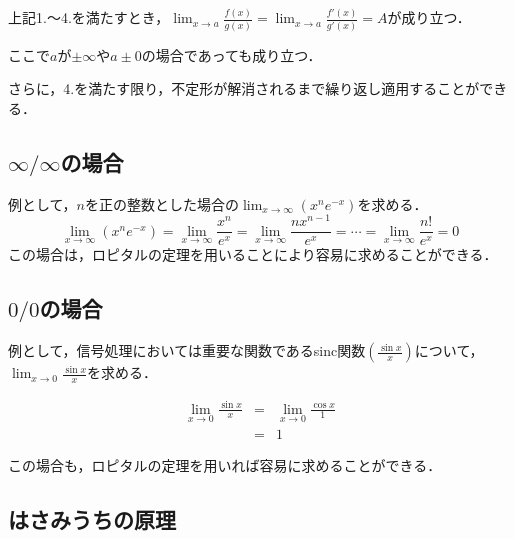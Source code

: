 
上記1.～4.を満たすとき，$\displaystyle \lim_{x \rightarrow a} \frac{f(x)}{g(x)} =\displaystyle \lim_{x \rightarrow a} \frac{f'(x)}{g'(x)} = A$が成り立つ．

ここで$a$が$\pm \infty$や$a\pm 0$の場合であっても成り立つ．

さらに，4.を満たす限り，不定形が解消されるまで繰り返し適用することができる．

\subsection{$\infty / \infty$の場合}

例として，$n$を正の整数とした場合の$\displaystyle \lim_{x \rightarrow \infty}(x^n e^{-x})$を求める．
\begin{equation}
\lim_{x \rightarrow \infty}(x^n e^{-x}) = \lim_{x \rightarrow \infty}\frac{x^n}{e^{x}} %
 =  \lim_{x \rightarrow \infty}\frac{nx^{n-1}}{e^{x}} =%
    \cdots %
 =  \lim_{x \rightarrow \infty}\frac{n!}{e^{x}} %
 =  0
\end{equation}
この場合は，ロピタルの定理を用いることにより容易に求めることができる．

\subsection{$0 / 0$の場合}

例として，信号処理においては重要な関数であるsinc関数$\displaystyle (\frac{\sin x}{x})$について，$\displaystyle \lim_{x \rightarrow 0}\frac{\sin x}{x}$を求める．

\begin{eqnarray}
\lim_{x \rightarrow 0}\frac{\sin x}{x} &=& \lim_{x \rightarrow 0}\frac{\cos x}{1} \nonumber \\
&=& 1
\end{eqnarray}

\noindent この場合も，ロピタルの定理を用いれば容易に求めることができる．

\subsection{はさみうちの原理}


